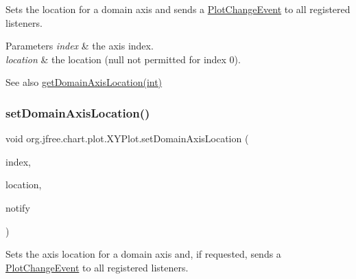 Sets the location for a domain axis and sends a \mbox{\hyperlink{}{Plot\+Change\+Event}} to all registered listeners.


\begin{DoxyParams}{Parameters}
{\em index} & the axis index. \\
\hline
{\em location} & the location ({\ttfamily null} not permitted for index 0).\\
\hline
\end{DoxyParams}
\begin{DoxySeeAlso}{See also}
\mbox{\hyperlink{classorg_1_1jfree_1_1chart_1_1plot_1_1_x_y_plot_adb9a01f67817531cfb75036a3c2c2df4}{get\+Domain\+Axis\+Location(int)}} 
\end{DoxySeeAlso}
\mbox{\label{classorg_1_1jfree_1_1chart_1_1plot_1_1_x_y_plot_ac86ea54d796fda545caf8957bdc066f9}} 
\subsubsection{\texorpdfstring{set\+Domain\+Axis\+Location()}{setDomainAxisLocation()}\hspace{0.1cm}{\footnotesize\ttfamily [4/4]}}
{\footnotesize\ttfamily void org.\+jfree.\+chart.\+plot.\+X\+Y\+Plot.\+set\+Domain\+Axis\+Location (\begin{DoxyParamCaption}\item[{int}]{index,  }\item[{\mbox{\hyperlink{classorg_1_1jfree_1_1chart_1_1axis_1_1_axis_location}{Axis\+Location}}}]{location,  }\item[{boolean}]{notify }\end{DoxyParamCaption})}

Sets the axis location for a domain axis and, if requested, sends a \mbox{\hyperlink{}{Plot\+Change\+Event}} to all registered listeners.


